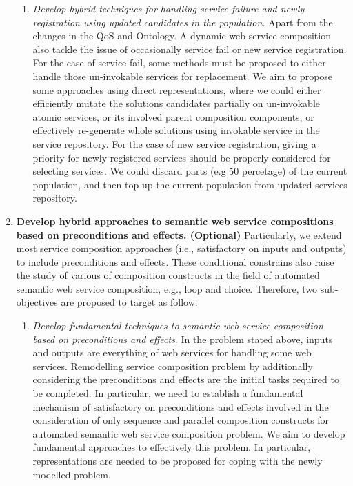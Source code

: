 \begin{enumerate}
\begin{enumerate}
 
 \item \emph{Develop hybrid techniques for handling service failure and newly registration using updated candidates in the population.} Apart from the changes in the QoS and Ontology. A dynamic web service composition also tackle the issue of occasionally service fail or new service registration. For the case of service fail, some methods must be proposed to either handle those un-invokable services for replacement. We aim to propose some approaches using direct representations, where we could either efficiently mutate the solutions candidates partially on un-invokable atomic services, or its involved parent composition components, or effectively re-generate whole solutions using invokable service in the service repository. For the case of new service registration, giving a priority for newly registered services should be properly considered for selecting services. We could discard parts (e.g 50 percetage) of the current population, and then top up the current population from updated services repository.
 
 \end{enumerate}
  
 \item \textbf{Develop hybrid approaches to semantic web service compositions based on preconditions and effects. (Optional)} Particularly, we extend most service composition approaches (i.e., satisfactory on inputs and outputs) to include preconditions and effects. These conditional constrains also raise the study of various of composition constructs in the field of automated semantic web service composition, e.g., loop and choice. Therefore, two sub-objectives are proposed to target as follow.
 \begin{enumerate}
 
  \item \emph{Develop fundamental techniques to semantic web service composition based on preconditions and effects}. In the problem stated above, inputs and outputs are everything of web services for handling some web services.  Remodelling service composition problem by additionally considering the preconditions and effects are the initial tasks required to be completed.  In particular, we need to establish a fundamental mechanism of satisfactory on preconditions and effects involved in the consideration of only sequence and parallel composition constructs for automated semantic web service composition problem. We aim to develop fundamental approaches to effectively this problem. In particular, representations are needed to be proposed for coping with the newly modelled problem.



\end{enumerate}
\end{enumerate}
